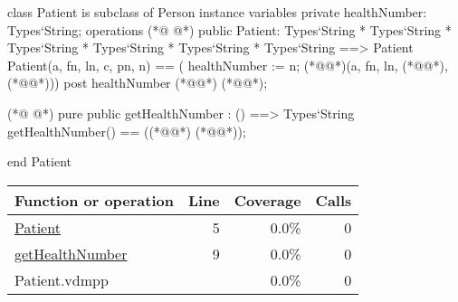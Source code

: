 \begin{vdmpp}[breaklines=true]
class Patient is subclass of Person
instance variables
  private healthNumber: Types`String;
operations
(*@
\label{Patient:5}
@*)
 public Patient: Types`String * Types`String * Types`String * Types`String * Types`String * Types`String ==> Patient
  Patient(a, fn, ln, c, pn, n) == ( healthNumber := n; (*@@*)(a, fn, ln, (*@@*), (*@@*)))
 post healthNumber (*@\vdmnotcovered{=}@*) (*@@*);
 
(*@
\label{getHealthNumber:9}
@*)
 pure public getHealthNumber : () ==> Types`String
  getHealthNumber() == ((*@@*) (*@@*));

end Patient
\end{vdmpp}
\bigskip
\begin{longtable}{|l|r|r|r|}
\hline
Function or operation & Line & Coverage & Calls \\
\hline
\hline
\hyperref[Patient:5]{Patient} & 5&0.0\% & 0 \\
\hline
\hyperref[getHealthNumber:9]{getHealthNumber} & 9&0.0\% & 0 \\
\hline
\hline
Patient.vdmpp & & 0.0\% & 0 \\
\hline
\end{longtable}

